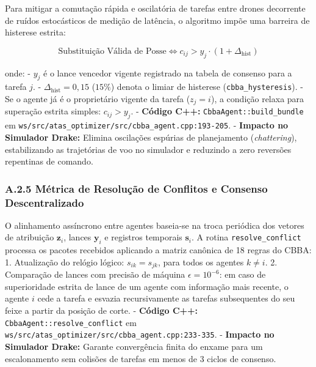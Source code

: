\documentclass[
  brazilian,
  a4paper]{article}
\begin{document}
Para mitigar a comutação rápida e oscilatória de tarefas entre drones
decorrente de ruídos estocásticos de medição de latência, o algoritmo
impõe uma barreira de histerese estrita:

\[\text{Substituição Válida de Posse} \iff c_{ij} > y_j \cdot (1 + \Delta_{\text{hist}})\]

onde: - \(y_j\) é o lance vencedor vigente registrado na tabela de
consenso para a tarefa \(j\). - \(\Delta_{\text{hist}} = 0{,}15\)
(\(15\%\)) denota o limiar de histerese (\texttt{cbba\_\allowbreak{}hysteresis}). -
Se o agente já é o proprietário vigente da tarefa (\(z_j = i\)), a
condição relaxa para superação estrita simples: \(c_{ij} > y_j\). -
\textbf{Código C++:} \texttt{CbbaAgent:\allowbreak{}:\allowbreak{}build\_\allowbreak{}bundle} em
\texttt{ws/\allowbreak{}src/\allowbreak{}atas\_\allowbreak{}optimizer/\allowbreak{}src/\allowbreak{}cbba\_\allowbreak{}agent.\allowbreak{}cpp:\allowbreak{}193-205}. -
\textbf{Impacto no Simulador Drake:} Elimina oscilações espúrias de
planejamento (\emph{chattering}), estabilizando as trajetórias de voo no
simulador e reduzindo a zero reversões repentinas de comando.

\subsubsection{A.2.5 Métrica de Resolução de Conflitos e Consenso
Descentralizado}\label{a.2.5-muxe9trica-de-resoluuxe7uxe3o-de-conflitos-e-consenso-descentralizado}

O alinhamento assíncrono entre agentes baseia-se na troca periódica dos
vetores de atribuição \(\mathbf{z}_i\), lances \(\mathbf{y}_i\) e
registros temporais \(\mathbf{s}_i\). A rotina
\texttt{resolve\_\allowbreak{}conflict} processa os pacotes recebidos aplicando a
matriz canônica de 18 regras do CBBA: 1. Atualização do relógio lógico:
\(s_{ik} = s_{jk}\), para todos os agentes \(k \ne i\). 2. Comparação de
lances com precisão de máquina \(\epsilon = 10^{-6}\): em caso de
superioridade estrita de lance de um agente com informação mais recente,
o agente \(i\) cede a tarefa e esvazia recursivamente as tarefas
subsequentes do seu feixe a partir da posição de corte. - \textbf{Código
C++:} \texttt{CbbaAgent:\allowbreak{}:\allowbreak{}resolve\_\allowbreak{}conflict} em
\texttt{ws/\allowbreak{}src/\allowbreak{}atas\_\allowbreak{}optimizer/\allowbreak{}src/\allowbreak{}cbba\_\allowbreak{}agent.\allowbreak{}cpp:\allowbreak{}233-335}. -
\textbf{Impacto no Simulador Drake:} Garante convergência finita do
enxame para um escalonamento sem colisões de tarefas em menos de 3
ciclos de consenso.
\end{document}
